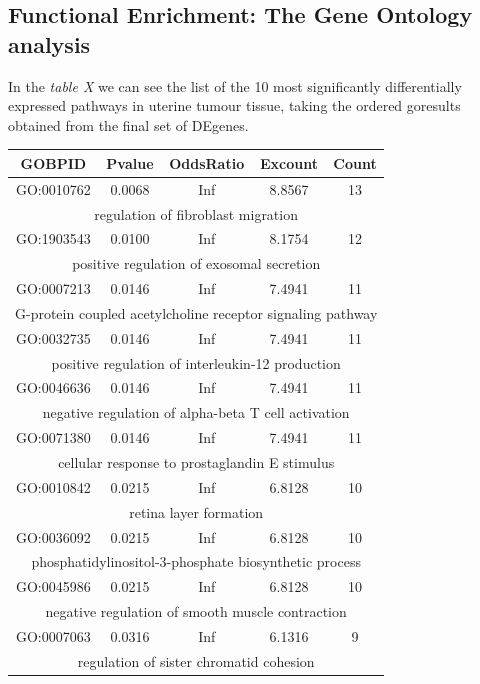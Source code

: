 \documentclass[9pt,twocolumn,twoside]{gsajnl}
\begin{document}
\subsection{Functional Enrichment: The Gene Ontology analysis}

In the \textit{table X} we can see the list of the 10 most significantly differentially expressed pathways in uterine tumour tissue, taking the ordered goresults obtained from the final set of DEgenes. 

\begin{center}
 \begin{tabular}{|| c c c c c||} 
 \hline
 \textbf{GOBPID} & \textbf{Pvalue} & \textbf{OddsRatio} & \textbf{Excount} & \textbf{Count} \\ [0.5ex] 
 \hline\hline
 GO:0010762 & 0.0068 & Inf & 8.8567 & 13 \\
 \multicolumn{5}{||c||}{regulation of fibroblast migration} \\ 
 \hline
 GO:1903543 & 0.0100 & Inf & 8.1754 & 12 \\
 \multicolumn{5}{||c||}{positive regulation of exosomal secretion} \\ 
 \hline
 GO:0007213 & 0.0146 & Inf & 7.4941 & 11 \\
 \multicolumn{5}{||c||}{G-protein coupled acetylcholine receptor signaling pathway} \\ 
 \hline
 GO:0032735 & 0.0146 & Inf & 7.4941 & 11 \\
 \multicolumn{5}{||c||}{positive regulation of interleukin-12 production} \\ 
  \hline
 GO:0046636 & 0.0146 & Inf & 7.4941 & 11 \\
 \multicolumn{5}{||c||}{negative regulation of alpha-beta T cell activation} \\ 
  \hline
 GO:0071380 & 0.0146 & Inf & 7.4941 & 11 \\
 \multicolumn{5}{||c||}{cellular response to prostaglandin E stimulus} \\ 
  \hline
 GO:0010842 & 0.0215 & Inf & 6.8128 & 10 \\
 \multicolumn{5}{||c||}{retina layer formation} \\ 
  \hline
 GO:0036092 & 0.0215 & Inf & 6.8128 & 10 \\
 \multicolumn{5}{||c||}{phosphatidylinositol-3-phosphate biosynthetic process} \\ 
  \hline
 GO:0045986 & 0.0215 & Inf & 6.8128 & 10 \\
 \multicolumn{5}{||c||}{negative regulation of smooth muscle contraction} \\ 
  \hline
 GO:0007063 &  0.0316 & Inf & 6.1316 & 9 \\
 \multicolumn{5}{||c||}{regulation of sister chromatid cohesion} \\ 
 \hline
\end{tabular}
\end{center}
\end{document}
